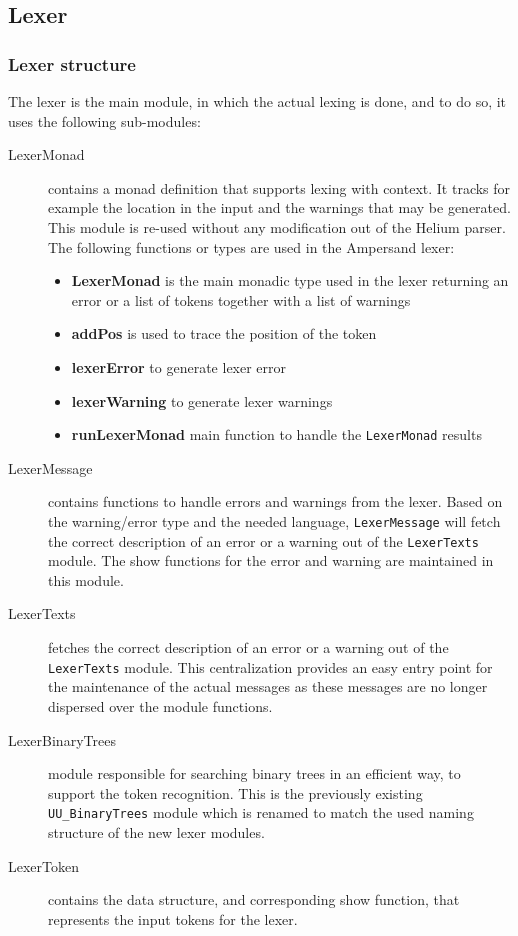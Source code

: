 
\subsection{Lexer}
\label{design:lexer}

\subsubsection{Lexer structure}
The lexer is the main module, in which the actual lexing is done, and to do so, it uses the following sub-modules:

 \begin{description}
 
    \item[LexerMonad] contains a monad definition that supports lexing with context.
      It tracks for example the location in the input and the warnings that may be generated.
	  This module is re-used without any modification out of the  Helium parser.
      The following functions or types are used in the Ampersand lexer:
	  \begin{itemize}
		\item \textbf{LexerMonad} is the main monadic type used in the lexer returning an error or a list of tokens together with a list of warnings
		\item \textbf{addPos} is used to trace the position of the token
		\item \textbf{lexerError} to generate lexer error
		\item \textbf{lexerWarning} to generate lexer warnings
		\item \textbf{runLexerMonad} main function to handle the \texttt{LexerMonad} results 
	  \end{itemize}
	  
    \item[LexerMessage] contains functions to handle errors and warnings from the lexer.
	  Based on the warning/error type and the needed language, \texttt{LexerMessage} will fetch the correct description of an error or a warning out of the \texttt{LexerTexts} module.
	  The show functions for the error and warning are maintained in this module.
	  
    \item[LexerTexts] fetches the correct description of an error or a warning out of the \texttt{LexerTexts} module.
	  This centralization provides an easy entry point for the maintenance of the actual messages as these messages are no longer dispersed over the module functions.
	  
    \item[LexerBinaryTrees] module responsible for searching binary trees in an efficient way, to support the token recognition.
    This is the previously existing \texttt{UU\_BinaryTrees} module which is renamed to match the used naming structure of the new lexer modules.

    \item[LexerToken] contains the data structure, and corresponding show function, that represents the input tokens for the lexer.
	
  \end{description}


